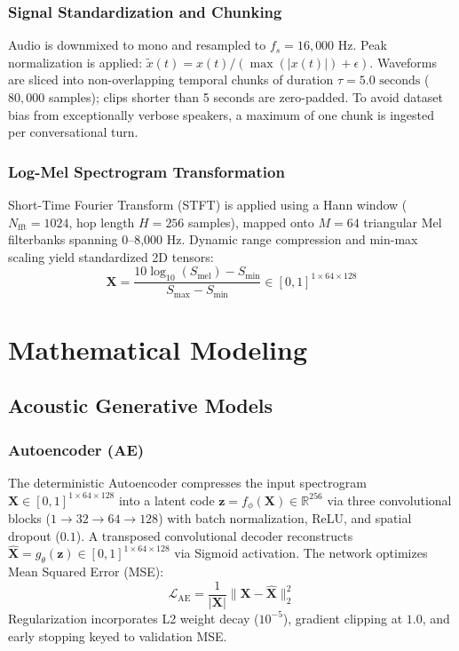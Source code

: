 \documentclass[conference]{IEEEtran}
\begin{document}
\subsubsection{Signal Standardization and Chunking}
Audio is downmixed to mono and resampled to $f_s = 16,000\text{ Hz}$. Peak normalization is applied: $\tilde{x}(t) = x(t) / (\max(|x(t)|) + \epsilon)$. Waveforms are sliced into non-overlapping temporal chunks of duration $\tau = 5.0\text{ seconds}$ ($80,000$ samples); clips shorter than 5 seconds are zero-padded. To avoid dataset bias from exceptionally verbose speakers, a maximum of one chunk is ingested per conversational turn.

\subsubsection{Log-Mel Spectrogram Transformation}
Short-Time Fourier Transform (STFT) is applied using a Hann window ($N_{\text{fft}} = 1024$, hop length $H = 256$ samples), mapped onto $M = 64$ triangular Mel filterbanks spanning 0--8,000 Hz. Dynamic range compression and min-max scaling yield standardized 2D tensors:
\begin{equation}
\mathbf{X} = \frac{10\log_{10}(S_{\text{mel}}) - S_{\text{min}}}{S_{\text{max}} - S_{\text{min}}} \in [0, 1]^{1 \times 64 \times 128}
\end{equation}

\section{Mathematical Modeling}
\label{sec:math_modeling}

\subsection{Acoustic Generative Models}

\subsubsection{Autoencoder (AE)}
The deterministic Autoencoder compresses the input spectrogram $\mathbf{X} \in [0, 1]^{1 \times 64 \times 128}$ into a latent code $\mathbf{z} = f_\phi(\mathbf{X}) \in \mathbb{R}^{256}$ via three convolutional blocks ($1 \to 32 \to 64 \to 128$) with batch normalization, ReLU, and spatial dropout ($0.1$). A transposed convolutional decoder reconstructs $\hat{\mathbf{X}} = g_\theta(\mathbf{z}) \in [0, 1]^{1 \times 64 \times 128}$ via Sigmoid activation. The network optimizes Mean Squared Error (MSE):
\begin{equation}
\mathcal{L}_{\text{AE}} = \frac{1}{|\mathbf{X}|} \|\mathbf{X} - \hat{\mathbf{X}}\|_2^2
\label{eq:ae_loss}
\end{equation}
Regularization incorporates L2 weight decay ($10^{-5}$), gradient clipping at $1.0$, and early stopping keyed to validation MSE.
\end{document}
